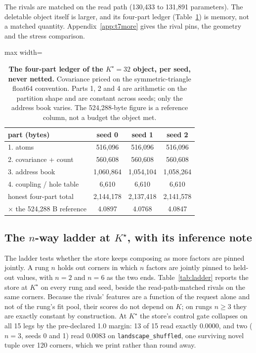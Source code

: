 \documentclass{article} %
\newcommand{\Kstar}{\ensuremath{K^{\star}}}
\begin{document}
\noindent The rivals are matched on the read path (130,433 to 131,891 parameters). The deletable
object itself is larger, and its four-part ledger (Table~\ref{tab:ledger-kstar}) is memory, not
a matched quantity. Appendix~\ref{app:t7more} gives the rival pins, the geometry and the stress
comparison. %

\begin{table}[t]
\centering\small
\caption{\textbf{The four-part ledger of the $\Kstar=32$ object, per seed, never netted.}
Covariance priced on the symmetric-triangle float64 convention. Parts 1, 2 and 4 are
arithmetic on the partition shape and are constant across seeds; only the address book varies.
The 524,288-byte figure is a reference column, not a budget the object met.}
\label{tab:ledger-kstar}
\begin{adjustbox}{max width=\linewidth}\begin{tabular}{lccc}
\toprule
part (bytes) & seed 0 & seed 1 & seed 2 \\
\midrule
1. atoms & 516,096 & 516,096 & 516,096 \\
2. covariance + count & 560,608 & 560,608 & 560,608 \\
3. address book & 1,060,864 & 1,054,104 & 1,058,264 \\
4. coupling / hole table & 6,610 & 6,610 & 6,610 \\
honest four-part total & 2,144,178 & 2,137,418 & 2,141,578 \\
$\times$ the 524,288 B reference & 4.0897 & 4.0768 & 4.0847 \\ %
\bottomrule
\end{tabular}\end{adjustbox}
\end{table}

\subsection{The $n$-way ladder at $\Kstar$, with its inference note}
\label{sec:ladder}

The ladder tests whether the store keeps composing as more factors are pinned jointly. A rung
$n$ holds out corners in which $n$ factors are jointly pinned to held-out values, with $n=2$ and
$n=6$ as the two ends. Table~\ref{tab:ladder} reports the store at $\Kstar$ on every rung and
seed, beside the read-path-matched rivals on the same corners. Because the rivals' features are
a function of the request alone and not of the rung's fit pool, their scores do not depend on
$K$; on rungs $n\ge3$ they are exactly constant by construction.
At $\Kstar$ the store's control gate collapses on all 15 legs by the pre-declared 1.0 margin:
13 of 15 read exactly 0.0000, and two ($n=3$, seeds 0 and 1) read 0.0083 on
\texttt{landscape\_shuffled}, one surviving novel tuple over 120 corners, which we print
rather than round away. %
\end{document}
